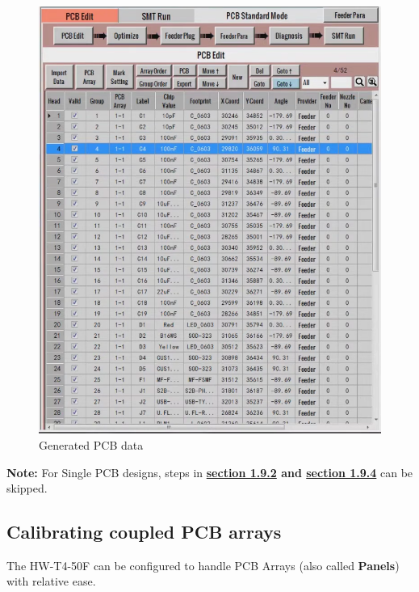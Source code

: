 \documentclass[a4paper,10pt]{report}
\begin{document}
\begin{figure}[!htb]
 \centering
 \includegraphics[width=1\textwidth]{scrot7_1.png}
 \caption{Generated PCB data}
\end{figure}
\textbf{Note:} For Single PCB designs, steps in \textbf{\textbf{\hyperref[sec:1.9.2]{section 1.9.2}} and \textbf{\hyperref[sec:1.9.4]{section 1.9.4}}} can be skipped.
\newpage
\subsection{Calibrating coupled PCB arrays}
\label{sec:1.9.2}
The HW-T4-50F can be configured to handle PCB Arrays (also called \textbf{Panels}) with relative ease.\\
\end{document}
